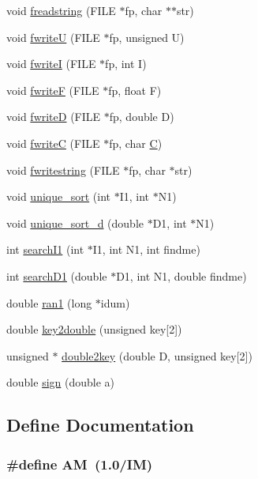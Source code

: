 \begin{CompactItemize}
\item 
void \hyperlink{useful__lib_8C_a49}{freadstring} (FILE $\ast$fp, char $\ast$$\ast$str)
\item 
void \hyperlink{useful__lib_8C_a50}{fwrite\-U} (FILE $\ast$fp, unsigned U)
\item 
void \hyperlink{useful__lib_8C_a51}{fwrite\-I} (FILE $\ast$fp, int I)
\item 
void \hyperlink{useful__lib_8C_a52}{fwrite\-F} (FILE $\ast$fp, float F)
\item 
void \hyperlink{useful__lib_8C_a53}{fwrite\-D} (FILE $\ast$fp, double D)
\item 
void \hyperlink{useful__lib_8C_a54}{fwrite\-C} (FILE $\ast$fp, char \hyperlink{constant_8h_a21}{C})
\item 
void \hyperlink{useful__lib_8C_a55}{fwritestring} (FILE $\ast$fp, char $\ast$str)
\item 
void \hyperlink{useful__lib_8C_a56}{unique\_\-sort} (int $\ast$I1, int $\ast$N1)
\item 
void \hyperlink{useful__lib_8C_a57}{unique\_\-sort\_\-d} (double $\ast$D1, int $\ast$N1)
\item 
int \hyperlink{useful__lib_8C_a58}{search\-I1} (int $\ast$I1, int N1, int findme)
\item 
int \hyperlink{useful__lib_8C_a59}{search\-D1} (double $\ast$D1, int N1, double findme)
\item 
double \hyperlink{useful__lib_8C_a60}{ran1} (long $\ast$idum)
\item 
double \hyperlink{useful__lib_8C_a61}{key2double} (unsigned key\mbox{[}2\mbox{]})
\item 
unsigned $\ast$ \hyperlink{useful__lib_8C_a62}{double2key} (double D, unsigned key\mbox{[}2\mbox{]})
\item 
double \hyperlink{useful__lib_8C_a63}{sign} (double a)
\end{CompactItemize}


\subsection{Define Documentation}
\hypertarget{useful__lib_8C_a2}{
\subsubsection[AM]{\setlength{\rightskip}{0pt plus 5cm}\#define AM\ (1.0/IM)}}
\label{useful__lib_8C_a2}


